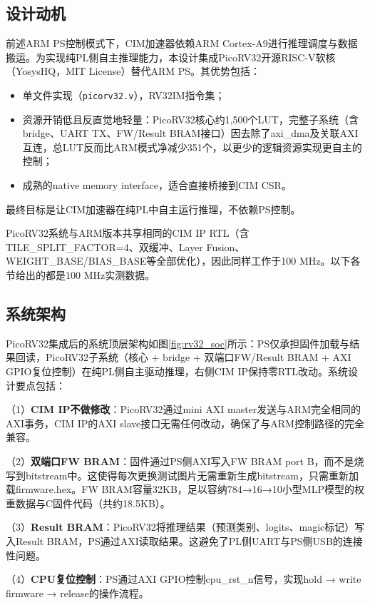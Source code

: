 \documentclass[12pt, a4paper]{article}
\begin{document}
\subsection{设计动机}

前述ARM PS控制模式下，CIM加速器依赖ARM Cortex-A9进行推理调度与数据搬运。为实现纯PL侧自主推理能力，本设计集成PicoRV32开源RISC-V软核（YosysHQ，MIT License）替代ARM PS。其优势包括：

\begin{itemize}
	\item 单文件实现（\texttt{picorv32.v}），RV32IM指令集；
	\item 资源开销低且反直觉地轻量：PicoRV32核心约1,500个LUT，完整子系统（含bridge、UART TX、FW/Result BRAM接口）因去除了axi\_dma及关联AXI互连，总LUT反而比ARM模式净减少351个，以更少的逻辑资源实现更自主的控制；
	\item 成熟的native memory interface，适合直接桥接到CIM CSR。
\end{itemize}

最终目标是让CIM加速器在纯PL中自主运行推理，不依赖PS控制。

PicoRV32系统与ARM版本共享相同的CIM IP RTL（含TILE\_SPLIT\_FACTOR=4、双缓冲、Layer Fusion、WEIGHT\_BASE/BIAS\_BASE等全部优化），因此同样工作于100 MHz。以下各节给出的都是100 MHz实测数据。

\subsection{系统架构}

PicoRV32集成后的系统顶层架构如图\ref{fig:rv32_soc}所示：PS仅承担固件加载与结果回读，PicoRV32子系统（核心 + bridge + 双端口FW/Result BRAM + AXI GPIO复位控制）在纯PL侧自主驱动推理，右侧CIM IP保持零RTL改动。系统设计要点包括：

（1）\textbf{CIM IP不做修改}：PicoRV32通过mini AXI master发送与ARM完全相同的AXI事务，CIM IP的AXI slave接口无需任何改动，确保了与ARM控制路径的完全兼容。

（2）\textbf{双端口FW BRAM}：固件通过PS侧AXI写入FW BRAM port B，而不是烧写到bitstream中。这使得每次更换测试图片无需重新生成bitstream，只需重新加载firmware.hex。FW BRAM容量32KB，足以容纳784→16→10小型MLP模型的权重数据与C固件代码（共约18.5KB）。

（3）\textbf{Result BRAM}：PicoRV32将推理结果（预测类别、logits、magic标记）写入Result BRAM，PS通过AXI读取结果。这避免了PL侧UART与PS侧USB的连接性问题。

（4）\textbf{CPU复位控制}：PS通过AXI GPIO控制cpu\_rst\_n信号，实现hold → write firmware → release的操作流程。
\end{document}
